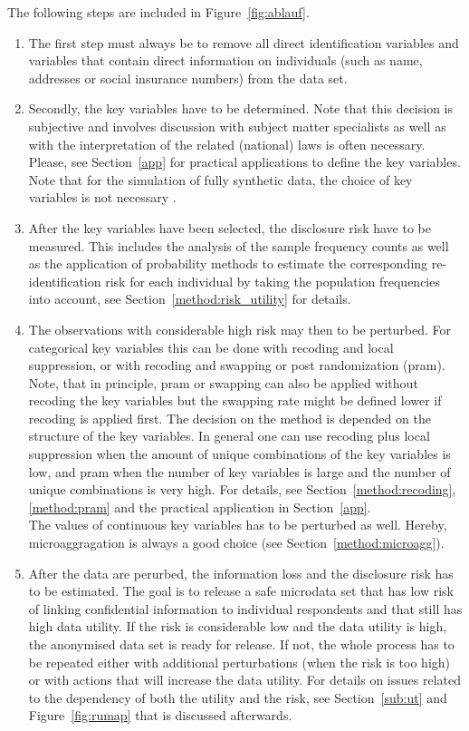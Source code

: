 \documentclass[12pt]{article}
\begin{document}
The following steps are included in Figure~\ref{fig:ablauf}.
\begin{enumerate}
\item The first step must always be to remove all direct identification variables and variables that contain direct information on 
individuals (such as name, addresses or social insurance numbers) from the data set.
\item Secondly, the key variables have to be determined. Note that this decision is subjective and 
involves discussion with subject matter specialists as well as with the interpretation of the related (national) laws 
is often necessary. Please, see Section~\ref{app} for 
practical applications to define the key variables. 
Note that for the simulation of fully synthetic data,
the choice of key variables is not necessary \citep{alfons11b}.
\item After the key variables have been selected, the disclosure risk have to be measured. 
This includes the analysis of the sample frequency counts as well as the application of 
probability methods to estimate the corresponding re-identification risk for each individual by taking
the population frequencies into account, 
see Section~\ref{method:risk_utility} for details.
\item The observations with considerable high risk may then to be perturbed. For categorical key
variables this can be done with recoding and local suppression, or with recoding and 
swapping or post randomization (pram). Note, that in principle, pram or swapping can
also be applied without recoding the key variables but the swapping rate might be defined lower
if recoding is applied first.
The decision on the method
is depended on the structure of the key variables. In general one can use recoding 
plus local suppression when
the amount of unique combinations of the key variables is low, 
and pram when the number of key variables
is large and the number of unique combinations is very high. 
For details, see Section~\ref{method:recoding}, \ref{method:pram} and 
the practical application in
Section~\ref{app}. \\
The values of continuous key variables has to be perturbed as well. 
Hereby, microaggragation is always 
a good choice (see Section~\ref{method:microagg}).
\item After the data are perurbed, the information 
loss and the disclosure risk has to be estimated.
The goal is to release a safe microdata set that has 
low risk of linking confidential information to individual respondents 
and that still has high data utility. 
If the risk is considerable low and the data utility is high, 
the anonymised data set is ready for release.
If not, the whole process has to be repeated either 
with additional perturbations (when the risk is too high) or
with actions that will increase the data utility. 
For details on issues related to 
the dependency of both the utility and the risk, see 
Section~\ref{sub:ut} and Figure~\ref{fig:rumap} that 
is discussed 
afterwards.
\end{enumerate}
\end{document}
